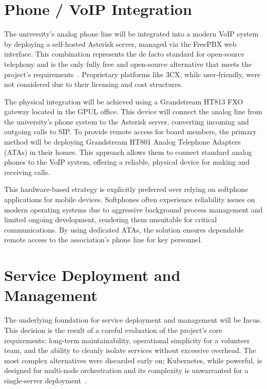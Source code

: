 \section{Phone / VoIP Integration}

The university's analog phone line will be integrated into a modern VoIP system by deploying a self-hosted Asterisk server, managed via the FreePBX web interface. This combination represents the de facto standard for open-source telephony and is the only fully free and open-source alternative that meets the project's requirements~\cite{AsteriskFeatures}. Proprietary platforms like 3CX, while user-friendly, were not considered due to their licensing and cost structures.

The physical integration will be achieved using a Grandstream HT813 FXO gateway located in the GPUL office. This device will connect the analog line from the university's phone system to the Asterisk server, converting incoming and outgoing calls to SIP. To provide remote access for board members, the primary method will be deploying Grandstream HT801 Analog Telephone Adapters (ATAs) in their homes. This approach allows them to connect standard analog phones to the VoIP system, offering a reliable, physical device for making and receiving calls.

This hardware-based strategy is explicitly preferred over relying on softphone applications for mobile devices. Softphones often experience reliability issues on modern operating systems due to aggressive background process management and limited ongoing development, rendering them unsuitable for critical communications. By using dedicated ATAs, the solution ensures dependable remote access to the association's phone line for key personnel.

\section{Service Deployment and Management}

The underlying foundation for service deployment and management will be Incus. This decision is the result of a careful evaluation of the project's core requirements: long-term maintainability, operational simplicity for a volunteer team, and the ability to cleanly isolate services without excessive overhead. The most complex alternatives were discarded early on; Kubernetes, while powerful, is designed for multi-node orchestration and its complexity is unwarranted for a single-server deployment~\cite{KubernetesDocs2025}.

